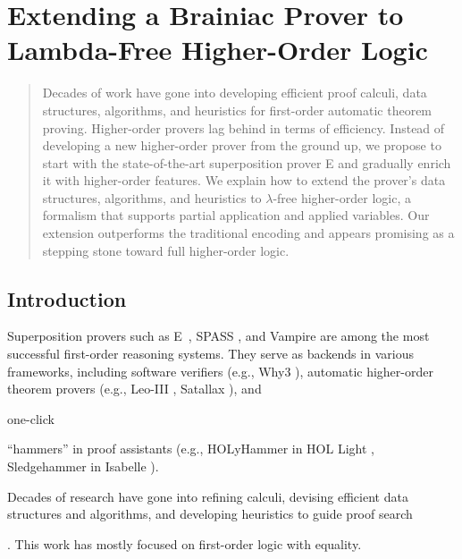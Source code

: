 \chapter{Extending a Brainiac Prover to Lambda-Free Higher-Order Logic}
\label{ch:ehoh}

\renewcommand{\confrep}[2]{#2}




\begin{abstract}
Decades of work have gone into developing efficient proof calculi, data
structures, algorithms, and heuristics for first-order automatic theorem
proving. Higher-order provers lag behind in terms of efficiency. Instead of
developing a new higher-order prover from the ground up, we propose to start
with the state-of-the-art superposition prover E and gradually enrich it with
higher-order features. We explain how to extend the prover's data structures,
algorithms, and heuristics to $\lambda$-free higher-order logic, a formalism
that supports partial application and applied variables. Our extension
outperforms the traditional encoding and appears promising as a stepping stone
toward full higher-order logic.    
\end{abstract}

\newpage

\section{Introduction}
\label{sec:ehoh:introduction}

\begin{sloppypar}
Superposition provers such as E~\cite{scv-19-e23}, SPASS \cite{wdfksw-09-spass},
and Vampire \cite{lkav-13-vampire} are among the most successful first-order
reasoning systems. They serve as backends in various frameworks, including
software verifiers (e.g., Why3 \cite{fp-13-why3}),
%
automatic higher-order theorem provers (e.g., \hbox{Leo-III} \cite{sb-21-leo3},
Satallax \cite{cb-12-satallax}), and \begin{rep}one-click \end{rep}``hammers'' in proof assistants
(e.g., HOLyHammer in HOL Light \cite{ku-15-holyhammer}, Sledgehammer in
Isabelle \cite{pb-12-sh}).


Dec\-ades of research have gone
into refining calculi, devising efficient data structures and algorithms,
and developing heuristics to guide proof search\begin{rep}
  \cite{ss-17-arcade}\end{rep}.
This work has mostly focused on first-order logic with equality.
\end{sloppypar}

